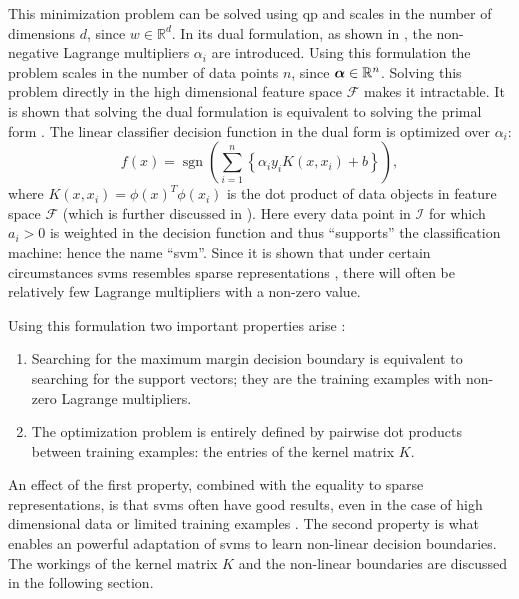 This minimization problem can be solved using \gls{qp} and scales in the number of dimensions $d$, since $w \in \mathbb{R}^d$.
In its dual formulation, as shown in , the non-negative Lagrange multipliers $\alpha_i$ are introduced.
Using this formulation the problem scales in the number of data points $n$, since $\vectorsym{\alpha} \in \mathbb{R}^n$.
Solving this problem directly in the high dimensional feature space $\mathcal{F}$ makes it intractable.
It is shown that solving the dual formulation is equivalent to solving the primal form \cite{cherkassky2007learning}.
The linear classifier decision function in the dual form is optimized over $\alpha_i$:
\begin{equation}\label{eq:svm_lagrange}
  f(x) = \operatorname{sgn}( \sum_{i=1}^n \left\{ \alpha_i y_i K(x, x_i) + b \right\} ),
\end{equation}
where $K(x, x_i) = \phi(x)^T\phi(x_i)$ is the dot product of data objects in feature space $\mathcal{F}$ (which is further discussed in ).
Here every data point in $\mathcal{I}$ for which $a_i > 0$ is weighted in the decision function and thus ``supports'' the classification machine: hence the name ``\acrlong{svm}''.
Since it is shown that under certain circumstances \glspl{svm} resembles sparse representations \cite{girosi1998equivalence,smola1998connection}, there will often be relatively few Lagrange multipliers with a non-zero value.

Using this formulation two important properties arise \cite{flach2012machine}:
\begin{enumerate}
  \item Searching for the maximum margin decision boundary is equivalent to searching for the support vectors; they are the training examples with non-zero Lagrange multipliers.
  \item The optimization problem is entirely defined by pairwise dot products between training examples: the entries of the kernel matrix $K$.
\end{enumerate}
An effect of the first property, combined with the equality to sparse representations, is that \glspl{svm} often have good results, even in the case of high dimensional data or limited training examples \cite{cherkassky2007learning}.
The second property is what enables an powerful adaptation of \glspl{svm} to learn non-linear decision boundaries.
The workings of the kernel matrix $K$ and the non-linear boundaries are discussed in the following section.

